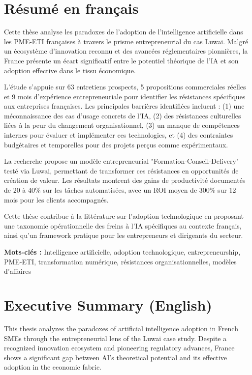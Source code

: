 \section*{Résumé en français}

Cette thèse analyse les paradoxes de l'adoption de l'intelligence artificielle dans les PME-ETI françaises à travers le prisme entrepreneurial du cas Luwai. Malgré un écosystème d'innovation reconnu et des avancées réglementaires pionnières, la France présente un écart significatif entre le potentiel théorique de l'IA et son adoption effective dans le tissu économique.

L'étude s'appuie sur 63 entretiens prospects, 5 propositions commerciales réelles et 9 mois d'expérience entrepreneuriale pour identifier les résistances spécifiques aux entreprises françaises. Les principales barrières identifiées incluent : (1) une méconnaissance des cas d'usage concrets de l'IA, (2) des résistances culturelles liées à la peur du changement organisationnel, (3) un manque de compétences internes pour évaluer et implémenter ces technologies, et (4) des contraintes budgétaires et temporelles pour des projets perçus comme expérimentaux.

La recherche propose un modèle entrepreneurial "Formation-Conseil-Delivery" testé via Luwai, permettant de transformer ces résistances en opportunités de création de valeur. Les résultats montrent des gains de productivité documentés de 20 à 40\% sur les tâches automatisées, avec un ROI moyen de 300\% sur 12 mois pour les clients accompagnés.

Cette thèse contribue à la littérature sur l'adoption technologique en proposant une taxonomie opérationnelle des freins à l'IA spécifiques au contexte français, ainsi qu'un framework pratique pour les entrepreneurs et dirigeants du secteur.

\textbf{Mots-clés :} Intelligence artificielle, adoption technologique, entrepreneurship, PME-ETI, transformation numérique, résistances organisationnelles, modèles d'affaires

\section*{Executive Summary (English)}

This thesis analyzes the paradoxes of artificial intelligence adoption in French SMEs through the entrepreneurial lens of the Luwai case study. Despite a recognized innovation ecosystem and pioneering regulatory advances, France shows a significant gap between AI's theoretical potential and its effective adoption in the economic fabric.

